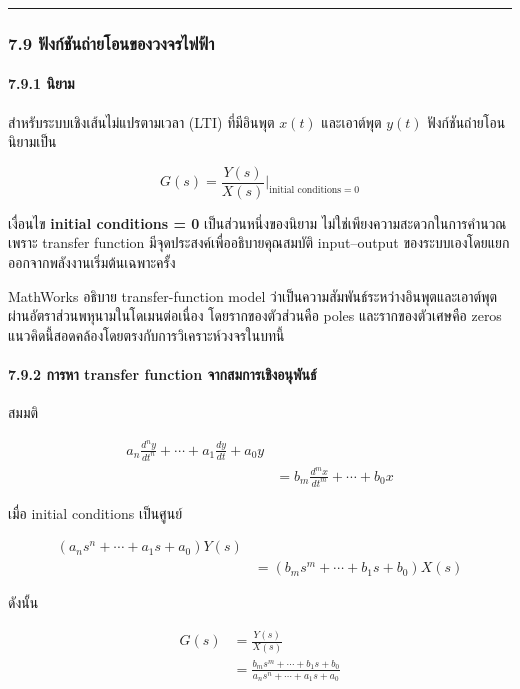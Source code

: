 \par\noindent\rule{\textwidth}{0.4pt}\par

\subsubsection{7.9 ฟังก์ชันถ่ายโอนของวงจรไฟฟ้า}

\paragraph{7.9.1 นิยาม}

สำหรับระบบเชิงเส้นไม่แปรตามเวลา (LTI) ที่มีอินพุต $x(t)$ และเอาต์พุต $y(t)$ ฟังก์ชันถ่ายโอนนิยามเป็น

\[
\boxed{G(s)=\frac{Y(s)}{X(s)}\bigg|_{\text{initial conditions}=0}}
\]

เงื่อนไข \textbf{initial conditions = 0} เป็นส่วนหนึ่งของนิยาม ไม่ใช่เพียงความสะดวกในการคำนวณ เพราะ transfer function มีจุดประสงค์เพื่ออธิบายคุณสมบัติ input–output ของระบบเองโดยแยกออกจากพลังงานเริ่มต้นเฉพาะครั้ง

MathWorks อธิบาย transfer-function model ว่าเป็นความสัมพันธ์ระหว่างอินพุตและเอาต์พุตผ่านอัตราส่วนพหุนามในโดเมนต่อเนื่อง โดยรากของตัวส่วนคือ poles และรากของตัวเศษคือ zeros แนวคิดนี้สอดคล้องโดยตรงกับการวิเคราะห์วงจรในบทนี้

\paragraph{7.9.2 การหา transfer function จากสมการเชิงอนุพันธ์}

สมมติ

\[
\begin{aligned}
    a_n\frac{d^ny}{dt^n}+\cdots+a_1\frac{dy}{dt}+a_0y \\
    &=b_m\frac{d^mx}{dt^m}+\cdots+b_0x
\end{aligned}
\]

เมื่อ initial conditions เป็นศูนย์

\[
\begin{aligned}
    (a_ns^n+\cdots+a_1s+a_0)Y(s) \\
    &=(b_ms^m+\cdots+b_1s+b_0)X(s)
\end{aligned}
\]

ดังนั้น

\[
\begin{aligned}
    G(s)&=\frac{Y(s)}{X(s)} \\
    &=\frac{b_ms^m+\cdots+b_1s+b_0}{a_ns^n+\cdots+a_1s+a_0}
\end{aligned}
\]

